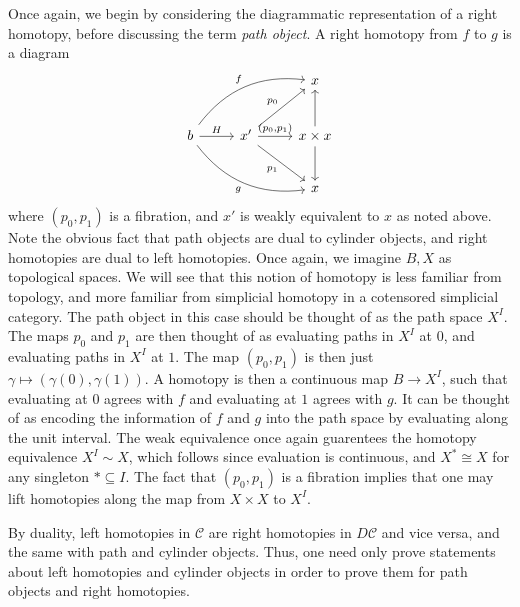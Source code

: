 \begin{intuition}
	Once again, we begin by considering the diagrammatic representation of a right homotopy, before discussing the term \emph{path object}. A right homotopy from $f$ to $g$ is a diagram
	\[\begin{tikzcd}[row sep = 2.5em, column sep = 2.5em]
	 &  & x \\
	b \ar[" H ", r] \ar[" f ", bend left, urr] \ar[" g "', bend right, drr]  & x' \ar[" p_0 ", ur] \ar[" p_1 "', dr] \ar[" (p_0\text{,} p_1) ", r]  & x\times x\ar[u] \ar[d]  \\
	 &  & x
	\end{tikzcd}\]
	where $(p_0,p_1)$ is a fibration, and $x'$ is weakly equivalent to $x$ as noted above. Note the obvious fact that path objects are dual to cylinder objects, and right homotopies are dual to left homotopies. Once again, we imagine $B,X$ as topological spaces. We will see that this notion of homotopy is less familiar from topology, and more familiar from simplicial homotopy in a cotensored simplicial category. The path object in this case should be thought of as the path space $X^I$. The maps $p_0$ and $p_1$ are then thought of as evaluating paths in $X^I$ at $0$, and evaluating paths in $X^I$ at $1$. The map $(p_0,p_1)$ is then just $\gamma\mapsto (\gamma(0),\gamma(1))$. A homotopy is then a continuous map $B\to X^I$, such that evaluating at $0$ agrees with $f$ and evaluating at $1$ agrees with $g$. It can be thought of as encoding the information of $f$ and $g$ into the path space by evaluating along the unit interval. The weak equivalence once again guarentees the homotopy equivalence $X^I\sim X$, which follows since evaluation is continuous, and $X^*\cong X$ for any singleton $*\subseteq I$. The fact that $(p_0,p_1)$ is a fibration implies that one may lift homotopies along the map from $X\times X$ to $X^I$.
\end{intuition}

\begin{remark}\label{1.2.10}
	By duality, left homotopies in $\mathcal{C} $ are right homotopies in $D\mathcal{C} $ and vice versa, and the same with path and cylinder objects. Thus, one need only prove statements about left homotopies and cylinder objects in order to prove them for path objects and right homotopies.
\end{remark}


